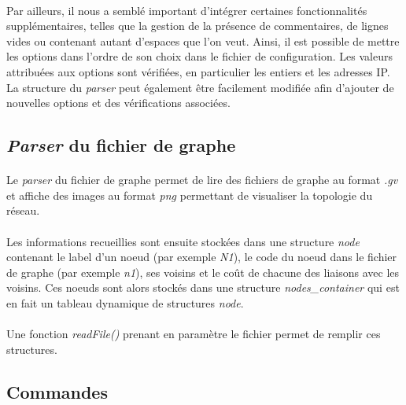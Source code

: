 \paragraph{}Par ailleurs, il nous a semblé important d'intégrer certaines fonctionnalités supplémentaires, telles que la gestion de la présence de commentaires,
de lignes vides ou contenant autant d'espaces que l'on veut. Ainsi, il est possible de
mettre les options dans l'ordre de son choix dans le fichier de
configuration. Les valeurs attribuées aux options sont vérifiées, en
particulier les entiers et les adresses IP. La structure du \textit{parser} peut également être facilement modifiée afin d'ajouter de nouvelles options et des vérifications
associées.

\subsection{\textit{Parser} du fichier de graphe}
\paragraph{}Le \textit{parser} du fichier de graphe permet de lire des fichiers de graphe au format \textit{.gv} et affiche des images au format \textit{png} permettant de visualiser la topologie du réseau.
\paragraph{}Les informations recueillies sont ensuite stockées dans une
structure \textit{node} contenant le label d'un noeud (par exemple \textit{N1}), le code du noeud dans le fichier de graphe (par exemple \textit{n1}), ses voisins et le
coût de chacune des liaisons avec les voisins. Ces noeuds sont alors
stockés dans une structure \textit{nodes\_container} qui est en fait un tableau
dynamique de structures \textit{node}.
\paragraph{}Une fonction \textit{readFile()} prenant en paramètre le fichier
permet de remplir ces structures. 
\subsection{Commandes}
